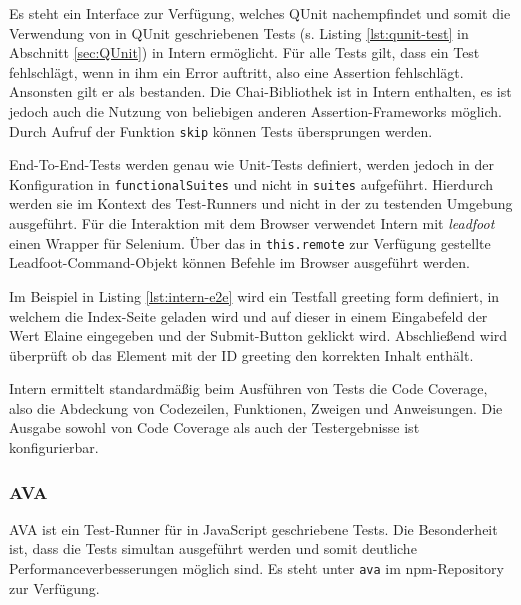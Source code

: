 Es steht ein Interface zur Verfügung, welches QUnit nachempfindet und somit die Verwendung von in QUnit geschriebenen Tests (s. Listing \ref{lst:qunit-test} in Abschnitt \ref{sec:QUnit}) in Intern ermöglicht. Für alle Tests gilt, dass ein Test fehlschlägt, wenn in ihm ein Error auftritt, also eine Assertion fehlschlägt. Ansonsten gilt er als bestanden. Die Chai-Bibliothek ist in Intern enthalten, es ist jedoch auch die Nutzung von beliebigen anderen Assertion-Frameworks möglich. Durch Aufruf der Funktion \texttt{skip} können Tests übersprungen werden.\cite{intern-userguide}

End-To-End-Tests werden genau wie Unit-Tests definiert, werden jedoch in der Konfiguration in \texttt{functionalSuites} und nicht in \texttt{suites} aufgeführt. Hierdurch werden sie im Kontext des Test-Runners und nicht in der zu testenden Umgebung ausgeführt. Für die Interaktion mit dem Browser verwendet Intern mit \textit{leadfoot} einen Wrapper für Selenium. Über das in \texttt{this.remote} zur Verfügung gestellte Leadfoot-Command-Objekt können Befehle im Browser ausgeführt werden.\cite{intern-userguide}

\begin{figure}[H]
	
\end{figure}

Im Beispiel in Listing \ref{lst:intern-e2e} wird ein Testfall \glqq greeting form\grqq{} definiert, in welchem die Index-Seite geladen wird und auf dieser in einem Eingabefeld der Wert \glqq Elaine\grqq{} eingegeben und der Submit-Button geklickt wird. Abschließend wird überprüft ob das Element mit der ID \glqq greeting\grqq{} den korrekten Inhalt enthält.

Intern ermittelt standardmäßig beim Ausführen von Tests die Code Coverage, also die Abdeckung von Codezeilen, Funktionen, Zweigen und Anweisungen. Die Ausgabe sowohl von Code Coverage als auch der Testergebnisse ist konfigurierbar.\cite{intern-userguide}

\subsubsection{AVA}
\label{sec:Ava}
AVA ist ein Test-Runner für in JavaScript geschriebene Tests. Die Besonderheit ist, dass die Tests simultan ausgeführt werden und somit deutliche Performanceverbesserungen möglich sind. Es steht unter \texttt{ava} im npm-Repository zur Verfügung.\cite{ava}

